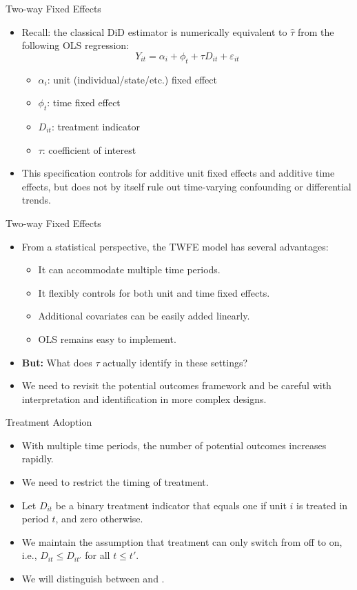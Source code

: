\documentclass[11pt,aspectratio=169]{beamer}
\begin{document}
\begin{frame}{Two-way Fixed Effects}
\begin{itemize}
  \item Recall: the classical DiD estimator is numerically equivalent to $\widehat\tau$ from the following OLS regression:
  \[Y_{it}=\alpha_i+\phi_t+\tau D_{it}+\varepsilon_{it}\]
  \begin{itemize}
    \item $\alpha_i$: unit (individual/state/etc.) fixed effect
    \item $\phi_t$: time fixed effect
    \item $D_{it}$: treatment indicator
    \item $\tau$: coefficient of interest
  \end{itemize}
  \item This specification controls for additive unit fixed effects and additive time effects, but does not by itself rule out time-varying confounding or differential trends.
\end{itemize}
\end{frame}

\begin{frame}{Two-way Fixed Effects}
\begin{itemize}
  \item From a statistical perspective, the TWFE model has several advantages:
  \begin{itemize}
    \item It can accommodate multiple time periods.
    \item It flexibly controls for both unit and time fixed effects.
    \item Additional covariates can be easily added linearly.
    \item OLS remains easy to implement.
  \end{itemize}
  \item \textbf{But:} What does $\tau$ actually identify in these settings?
  \item We need to revisit the potential outcomes framework and be careful with interpretation and identification in more complex designs.
\end{itemize}
\end{frame}

\begin{frame}{Treatment Adoption}
\begin{itemize}
  \item With multiple time periods, the number of potential outcomes increases rapidly.
  \item We need to restrict the timing of treatment.
  \item Let $D_{it}$ be a binary treatment indicator that equals one if unit $i$ is treated in period $t$, and zero otherwise.
  \item We maintain the assumption that treatment can only switch from off to on, i.e., $D_{it}\le D_{it'}$ for all $t\le t'$.
  \item We will distinguish between  and .
\end{itemize}
\end{frame}
\end{document}
